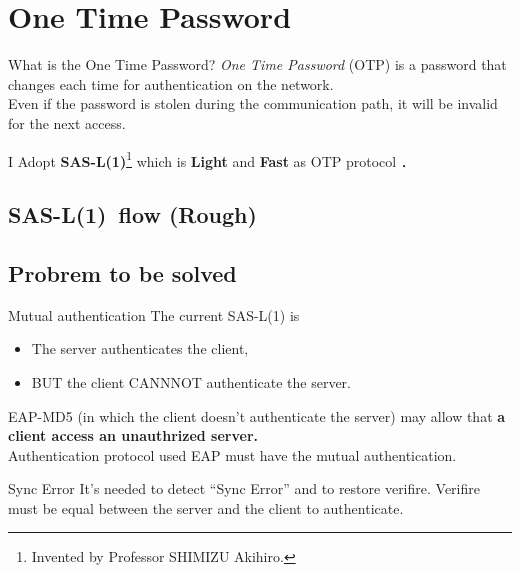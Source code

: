 \section{One Time Password}
\toc
\begin{frame}[c]{\fft}
    \begin{block}{What is the One Time Password?}
        \textit{One Time Password} (OTP) is a password that changes each time for authentication on the network.\\
        Even if the password is stolen during the communication {{path}}, it will be invalid for the next access.
    \end{block}
    \vfill
    I Adopt \textbf{\color{red} SAS-L(1)}\footnote{Invented by Professor SHIMIZU Akihiro.} which is \textbf{Light} and \textbf{Fast} as OTP protocol ．
\end{frame}
\subsection{SAS-L(1)\ flow (Rough)}
\begin{frame}{\ft}
    
\end{frame}
\subsection{Probrem to be solved}
\begin{frame}[t]{\ft}
    \begin{alertblock}{Mutual authentication\hfill\textbf{}}
        The current SAS-L(1) is
        \begin{itemize}
            \item The server authenticates the client,
            \item BUT the client CANNNOT authenticate the server.
        \end{itemize}
        EAP-MD5 (in which the client doesn't authenticate the server) may allow that
        \textbf{a client access an unauthrized server.}\\
        Authentication protocol used EAP must have the mutual authentication.
    \end{alertblock}
    \begin{alertblock}{Sync Error\hfill\textbf{}}
        It's needed to detect ``Sync Error'' and to restore verifire.
        Verifire must be equal between the server and the client to authenticate.
    \end{alertblock}
\end{frame}